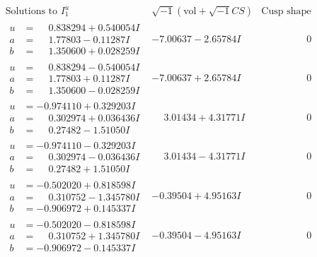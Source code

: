 \documentclass[1p]{elsarticle_modified}
\theoremstyle{definition}
\newcommand{\I}{\sqrt{-1}}
\begin{document}
$$\begin{array}{c|c|c}  
\text{Solutions to }I^u_{1}& \I (\text{vol} + \sqrt{-1}CS) & \text{Cusp shape}\\
 \hline 
\begin{aligned}
u &= \phantom{-}0.838294 + 0.540054 I \\
a &= \phantom{-}1.77803 - 0.11287 I \\
b &= \phantom{-}1.350600 + 0.028259 I\end{aligned}
 & -7.00637 - 2.65784 I & \phantom{-0.000000 } 0 \\ \hline\begin{aligned}
u &= \phantom{-}0.838294 - 0.540054 I \\
a &= \phantom{-}1.77803 + 0.11287 I \\
b &= \phantom{-}1.350600 - 0.028259 I\end{aligned}
 & -7.00637 + 2.65784 I & \phantom{-0.000000 } 0 \\ \hline\begin{aligned}
u &= -0.974110 + 0.329203 I \\
a &= \phantom{-}0.302974 + 0.036436 I \\
b &= \phantom{-}0.27482 - 1.51050 I\end{aligned}
 & \phantom{-}3.01434 + 4.31771 I & \phantom{-0.000000 } 0 \\ \hline\begin{aligned}
u &= -0.974110 - 0.329203 I \\
a &= \phantom{-}0.302974 - 0.036436 I \\
b &= \phantom{-}0.27482 + 1.51050 I\end{aligned}
 & \phantom{-}3.01434 - 4.31771 I & \phantom{-0.000000 } 0 \\ \hline\begin{aligned}
u &= -0.502020 + 0.818598 I \\
a &= \phantom{-}0.310752 - 1.345780 I \\
b &= -0.906972 + 0.145337 I\end{aligned}
 & -0.39504 + 4.95163 I & \phantom{-0.000000 } 0 \\ \hline\begin{aligned}
u &= -0.502020 - 0.818598 I \\
a &= \phantom{-}0.310752 + 1.345780 I \\
b &= -0.906972 - 0.145337 I\end{aligned}
 & -0.39504 - 4.95163 I & \phantom{-0.000000 } 0 \\ \hline\begin{aligned}

\end{aligned}
\end{array}$$
\end{document}
